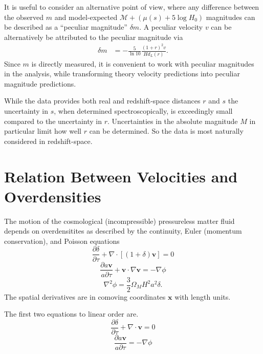 \documentclass[11pt, oneside]{article}   	%
\begin{document}
It is useful to consider an alternative point of view, where 
any difference between the observed $m$ and model-expected $\mathcal{M} + (\mu(s)+5\log{H_0})$ magnitudes
can be described as
a ``peculiar magnitude''  $\delta m$.  A peculiar velocity $v$ can be alternatively be attributed to 
the peculiar magnitude via
\begin{align}
\delta m & = -\frac{5}{\ln{10}}\frac{(1+r)^2v}{Hd_L(r)}. 
\end{align}
Since $m$ is directly measured, it is convenient to work with
peculiar magnitudes in the analysis, while transforming theory velocity predictions into peculiar magnitude predictions.


While the data provides both real and redshift-space distances $r$ and $s$ the uncertainty in
$s$, when determined spectroscopically, is exceedingly small compared to the uncertainty in $r$.
Uncertainties in the absolute magnitude  $M$ in particular limit how well $r$ can be
determined.  So the data is most naturally considered in redshift-space.

\section{Relation Between Velocities and Overdensities}
\label{fluid:sec}
The motion of the cosmological (incompressible) pressureless matter
fluid depends on overdensitites as described by the continuity, Euler
(momentum conservation), and Poisson equations
\begin{equation}
\frac{\partial \delta}{\partial \tau} + \nabla \cdot [(1+\delta)\mathbf{v}]=0
\end{equation}
\begin{equation}
\frac{\partial a \mathbf{v}}{a\partial \tau} + \mathbf{v} \cdot \nabla \mathbf{v} = - \nabla \phi
\end{equation}
\begin{equation}
\nabla^2\phi=\frac{3}{2} \Omega_MH^2a^2\delta.
\end{equation}
The spatial derivatives are in comoving coordinates  $\mathbf{x}$ with length units.

The first two  equations to linear order are.
\begin{equation}
\frac{\partial \delta}{\partial \tau} + \nabla \cdot \mathbf{v}=0
\end{equation}
\begin{equation}
\frac{\partial a \mathbf{v}}{a\partial \tau} = - \nabla \phi
\end{equation}
\end{document}
